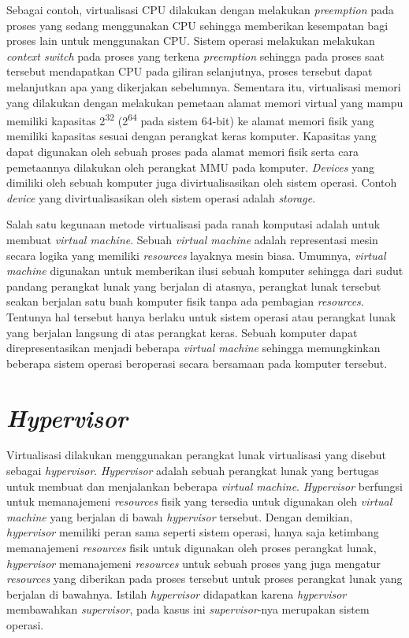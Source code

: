 Sebagai contoh, virtualisasi CPU dilakukan dengan melakukan \textit{preemption} pada proses yang
sedang menggunakan CPU sehingga memberikan kesempatan bagi proses lain untuk menggunakan CPU.
Sistem operasi melakukan melakukan \textit{context switch} pada proses yang terkena
\textit{preemption} sehingga pada proses saat tersebut mendapatkan CPU pada giliran selanjutnya,
proses tersebut dapat melanjutkan apa yang dikerjakan sebelumnya.  Sementara itu, virtualisasi
memori yang dilakukan dengan melakukan pemetaan alamat memori virtual yang mampu memiliki
kapasitas 2\textsuperscript{32} (2\textsuperscript{64} pada sistem 64-bit) ke alamat memori
fisik yang memiliki kapasitas sesuai dengan perangkat keras komputer.  Kapasitas yang dapat
digunakan oleh sebuah proses pada alamat memori fisik serta cara pemetaannya dilakukan oleh
perangkat MMU pada komputer.  \textit{Devices} yang dimiliki oleh sebuah komputer juga
divirtualisasikan oleh sistem operasi.  Contoh \textit{device} yang divirtualisasikan oleh
sistem operasi adalah \textit{storage}.

Salah satu kegunaan metode virtualisasi pada ranah komputasi adalah untuk membuat
\textit{virtual machine}.  Sebuah \textit{virtual machine} adalah representasi mesin secara
logika yang memiliki \textit{resources} layaknya mesin biasa.  Umumnya, \textit{virtual machine}
digunakan untuk memberikan ilusi sebuah komputer sehingga dari sudut pandang perangkat lunak
yang berjalan di atasnya, perangkat lunak tersebut seakan berjalan satu buah komputer fisik
tanpa ada pembagian \textit{resources}.  Tentunya hal tersebut hanya berlaku untuk sistem
operasi atau perangkat lunak yang berjalan langsung di atas perangkat keras.  Sebuah komputer
dapat direpresentasikan menjadi beberapa \textit{virtual machine} sehingga memungkinkan beberapa
sistem operasi beroperasi secara bersamaan pada komputer tersebut.

\section{\textit{Hypervisor}}

Virtualisasi dilakukan menggunakan perangkat lunak virtualisasi yang disebut sebagai
\textit{hypervisor}.  \textit{Hypervisor} adalah sebuah perangkat lunak yang bertugas untuk
membuat dan menjalankan beberapa \textit{virtual machine}.  \textit{Hypervisor} berfungsi untuk
memanajemeni \textit{resources} fisik yang tersedia untuk digunakan oleh \textit{virtual
machine} yang berjalan di bawah \textit{hypervisor} tersebut.  Dengan demikian,
\textit{hypervisor} memiliki peran sama seperti sistem operasi, hanya saja ketimbang
memanajemeni \textit{resources} fisik untuk digunakan oleh proses perangkat lunak,
\textit{hypervisor} memanajemeni \textit{resources} untuk sebuah proses yang juga mengatur
\textit{resources} yang diberikan pada proses tersebut untuk proses perangkat lunak yang
berjalan di bawahnya.  Istilah \textit{hypervisor} didapatkan karena \textit{hypervisor}
membawahkan \textit{supervisor}, pada kasus ini \textit{supervisor}-nya merupakan sistem
operasi.


